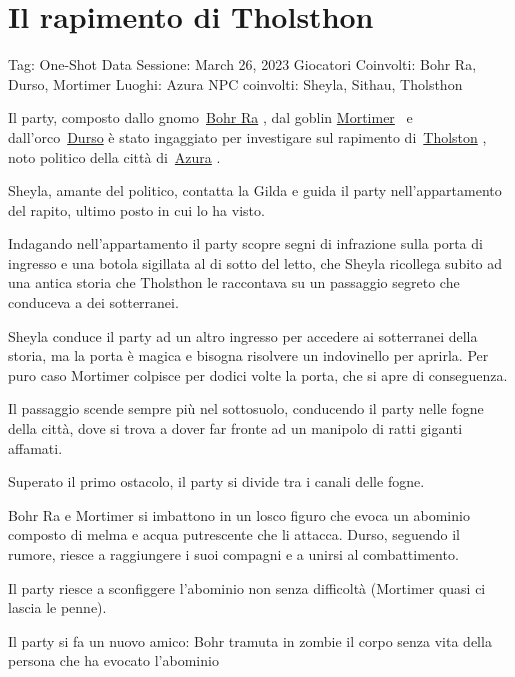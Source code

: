 \section{Il rapimento di Tholsthon}\label{il-rapimento-di-tholsthon}

Tag: One-Shot Data Sessione: March 26, 2023 Giocatori Coinvolti: Bohr
Ra, Durso, Mortimer Luoghi: Azura NPC coinvolti: Sheyla, Sithau,
Tholsthon

Il party, composto dallo
gnomo~\href{https://www.notion.so/Bohr-Ra-9e80062b753d4027977b28b4787cdd03?pvs=21}{Bohr
Ra} , dal goblin
\href{https://www.notion.so/Mortimer-cf3af7e978e44420a1e4d51a6f63639c?pvs=21}{Mortimer}
~e
dall'orco~\href{https://www.notion.so/Durso-e0d1279d4f7b45719911cfe259d75eb7?pvs=21}{Durso}
è stato ingaggiato per investigare sul rapimento
di~\href{https://www.notion.so/Tholston-32fc051c422746c49806adc9abff6a20?pvs=21}{Tholston}
, noto politico della città
di~\href{https://www.notion.so/Azura-242dca4e0a2844919fc3fe287f371b6d?pvs=21}{Azura}
.

Sheyla, amante del politico, contatta la Gilda e guida il party
nell'appartamento del rapito, ultimo posto in cui lo ha visto.

Indagando nell'appartamento il party scopre segni di infrazione sulla
porta di ingresso e una botola sigillata al di sotto del letto, che
Sheyla ricollega subito ad una antica storia che Tholsthon le raccontava
su un passaggio segreto che conduceva a dei sotterranei.

Sheyla conduce il party ad un altro ingresso per accedere ai sotterranei
della storia, ma la porta è magica e bisogna risolvere un indovinello
per aprirla. Per puro caso Mortimer colpisce per dodici volte la porta,
che si apre di conseguenza.

Il passaggio scende sempre più nel sottosuolo, conducendo il party nelle
fogne della città, dove si trova a dover far fronte ad un manipolo di
ratti giganti affamati.

Superato il primo ostacolo, il party si divide tra i canali delle fogne.

Bohr Ra e Mortimer si imbattono in un losco figuro che evoca un abominio
composto di melma e acqua putrescente che li attacca. Durso, seguendo il
rumore, riesce a raggiungere i suoi compagni e a unirsi al
combattimento.

Il party riesce a sconfiggere l'abominio non senza difficoltà (Mortimer
quasi ci lascia le penne).

Il party si fa un nuovo amico: Bohr tramuta in zombie il corpo senza
vita della persona che ha evocato l'abominio

